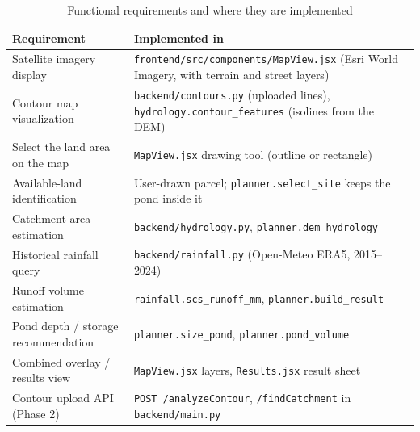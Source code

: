 \documentclass[manuscript,screen,review]{acmart}
\begin{document}
\begin{table}[h]
  \caption{Functional requirements and where they are implemented}
  \label{tab:requirements}
  \begin{tabular}{L{4.2cm}L{8.6cm}}
    \toprule
    Requirement & Implemented in \\
    \midrule
    Satellite imagery display & \texttt{frontend/src/components/MapView.jsx} (Esri World Imagery, with terrain and street layers) \\
    Contour map visualization & \texttt{backend/contours.py} (uploaded lines), \texttt{hydrology.contour\_features} (isolines from the DEM) \\
    Select the land area on the map & \texttt{MapView.jsx} drawing tool (outline or rectangle) \\
    Available-land identification & User-drawn parcel; \texttt{planner.select\_site} keeps the pond inside it \\
    Catchment area estimation & \texttt{backend/hydrology.py}, \texttt{planner.dem\_hydrology} \\
    Historical rainfall query & \texttt{backend/rainfall.py} (Open-Meteo ERA5, 2015--2024) \\
    Runoff volume estimation & \texttt{rainfall.scs\_runoff\_mm}, \texttt{planner.build\_result} \\
    Pond depth / storage recommendation & \texttt{planner.size\_pond}, \texttt{planner.pond\_volume} \\
    Combined overlay / results view & \texttt{MapView.jsx} layers, \texttt{Results.jsx} result sheet \\
    Contour upload API (Phase 2) & \texttt{POST /analyzeContour}, \texttt{/findCatchment} in \texttt{backend/main.py} \\
    \bottomrule
  \end{tabular}
\end{table}
\end{document}
